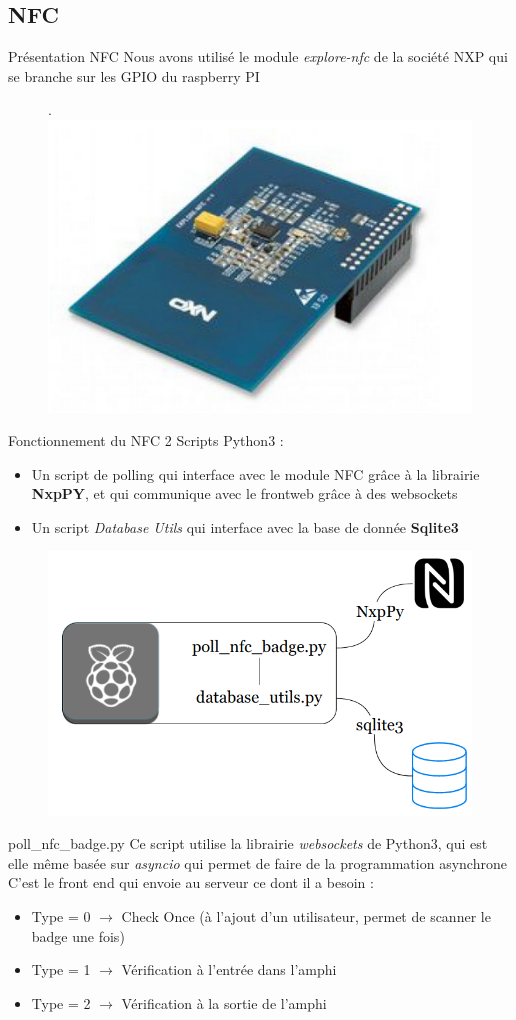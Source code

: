 \documentclass[aspectratio=169]{beamer}
\begin{document}
\subsection{NFC}

\begin{frame}{Présentation NFC}
    Nous avons utilisé le module \textit{explore-nfc} de la société NXP qui se branche sur les GPIO du raspberry PI
    \begin{figure}.
        \includegraphics[width=.5\textwidth]{../assets/explorenfc.png}
    \end{figure}
\end{frame}

\begin{frame}{Fonctionnement du NFC}
    2 Scripts Python3 :
    \begin{itemize}
        \item Un script de polling qui interface avec le module NFC grâce à la librairie \textbf{NxpPY}, et qui communique avec le frontweb grâce à des websockets
        \item Un script \textit{Database Utils} qui interface avec la base de donnée \textbf{Sqlite3}
    \end{itemize}
    \begin{figure}
        \centering
        \includegraphics[width=.5\textwidth]{../assets/nfcarchitecture.png}
    \end{figure}
\end{frame}

\begin{frame}{poll\_nfc\_badge.py}
    Ce script utilise la librairie \textit{websockets} de Python3, qui est elle même basée sur \textit{asyncio} qui permet de faire de la programmation asynchrone
    C'est le front end qui envoie au serveur ce dont il a besoin :
    \begin{itemize}
        \item Type = 0 $\rightarrow$ Check Once (à l'ajout d'un utilisateur, permet de scanner le badge une fois)
        \item Type = 1 $\rightarrow$ Vérification à l'entrée dans l'amphi
        \item Type = 2 $\rightarrow$ Vérification à la sortie de l'amphi
    \end{itemize}

\end{frame}
\end{document}
